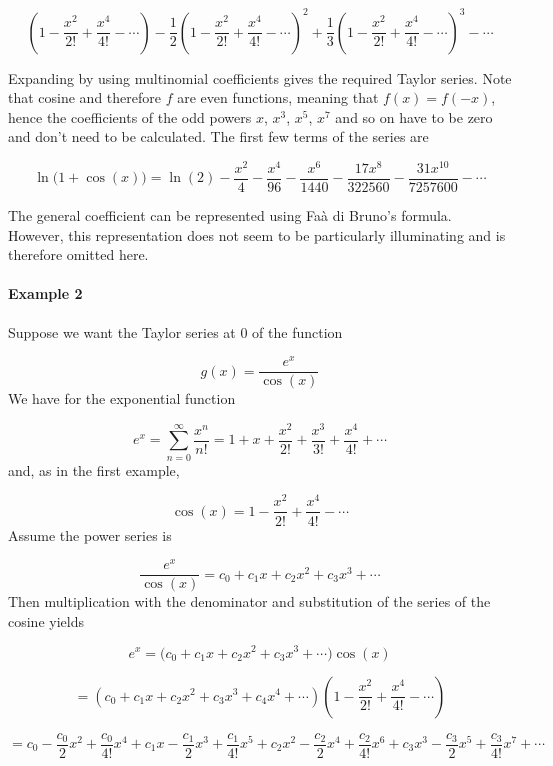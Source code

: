 $$\left(1-\frac{x^2}{2!}+\frac{x^4}{4!}-\cdots\right)-\frac12\left(1-\frac{x^2}{2!}+\frac{x^4}{4!}-\cdots\right)^2+\frac13\left(1-\frac{x^2}{2!}+\frac{x^4}{4!}-\cdots\right)^3-\cdots$$

Expanding by using multinomial coefficients gives the required Taylor series. Note that cosine and therefore $f$ are even functions, meaning that $f(x)=f(-x)$, hence the coefficients of the odd powers $x$, $x^3$, $x^5$, $x^7$ and so on have to be zero and don't need to be calculated. The first few terms of the series are



$$\ln\big(1+\cos(x)\big)=\ln(2)-\frac{x^2}{4}-\frac{x^4}{96}-\frac{x^6}{1440}-\frac{17x^8}{322560}-\frac{31x^{10}}{7257600}-\cdots$$

The general coefficient can be represented using Faà di Bruno's formula. However, this representation does not seem to be particularly illuminating and is therefore omitted here.



\paragraph{Example 2}



Suppose we want the Taylor series at 0 of the function



$$g(x)=\frac{e^x}{\cos(x)}$$ We have for the exponential function



$$e^x=\sum _{n=0}^\infty\frac{x^n}{n!}=1+x+\frac{x^2}{2!}+\frac{x^3}{3!}+\frac{x^4}{4!}+\cdots$$ and, as in the first example,



$$\cos(x)=1-\frac{x^2}{2!}+\frac{x^4}{4!}-\cdots$$ Assume the power series is



$$\frac{e^x}{\cos(x)}=c _0+c _1x+c _2x^2+c _3x^3+\cdots$$ Then multiplication with the denominator and substitution of the series of the cosine yields



$$e^x =\big(c _0+c _1x+c _2x^2+c _3x^3+\cdots\big)\cos(x)$$

$$=\left(c _0+c _1x+c _2x^2+c _3x^3+c _4x^4+\cdots\right)\left(1-\frac{x^2}{2!}+\frac{x^4}{4!}-\cdots\right)$$

$$=c _0-\frac{c _0}{2}x^2+\frac{c _0}{4!}x^4+c _1x-\frac{c _1}{2}x^3+\frac{c _1}{4!}x^5+c _2x^2-\frac{c _2}{2}x^4+\frac{c _2}{4!}x^6+c _3x^3-\frac{c _3}{2}x^5+\frac{c _3}{4!}x^7+\cdots$$

